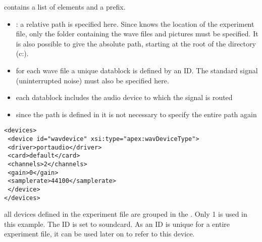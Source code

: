  contains a list of 
elements and a prefix.

\begin{itemize}
\item {}: a relative path is specified here.
Since \apex knows the location of the experiment file, only the
folder containing the wave files and pictures must be specified.
It is also possible to give the absolute path, starting at the
root of the directory (c:).


\item {} for each wave file a unique datablock is
defined by an ID. The standard signal (uninterrupted noise) must
also be specified here.

\item {} each datablock includes the audio device to
which the signal is routed

\item {} since the path is defined in
 it is not necessary to specify the entire
path again

  
 

\end{itemize}
\begin{lstlisting}
<devices>
 <device id="wavdevice" xsi:type="apex:wavDeviceType">
 <driver>portaudio</driver>
 <card>default</card>
 <channels>2</channels>
 <gain>0</gain>
 <samplerate>44100</samplerate>
 </device>
</devices>
\end{lstlisting}


 all devices defined in the experiment file are
grouped in the . Only 1  is used
in this example. The ID is set to soundcard. As an ID is unique
for a entire experiment file, it can be used later on to refer to
this device.

